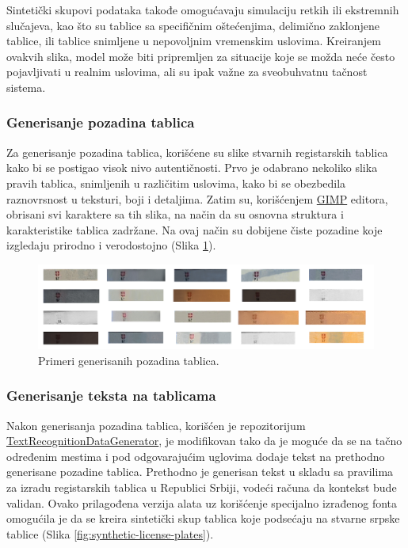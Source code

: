 \documentclass[a4paper,12pt]{article}
\begin{document}
	Sintetički skupovi podataka takođe omogućavaju simulaciju retkih ili ekstremnih slučajeva, kao što su tablice sa specifičnim oštećenjima, delimično zaklonjene tablice, ili tablice snimljene u nepovoljnim vremenskim uslovima. Kreiranjem ovakvih slika, model može biti pripremljen za situacije koje se možda neće često pojavljivati u realnim uslovima, ali su ipak važne za sveobuhvatnu tačnost sistema.
	
	\subsubsection{Generisanje pozadina tablica}
	
	Za generisanje pozadina tablica, korišćene su slike stvarnih registarskih tablica kako bi se postigao visok nivo autentičnosti. Prvo je odabrano nekoliko slika pravih tablica, snimljenih u različitim uslovima, kako bi se obezbedila raznovrsnost u teksturi, boji i detaljima. Zatim su, korišćenjem \href{https://www.gimp.org/}{GIMP} editora, obrisani svi karaktere sa tih slika, na način da su osnovna struktura i karakteristike tablica zadržane. Na ovaj način su dobijene čiste pozadine koje izgledaju prirodno i verodostojno (Slika \ref{fig:license-plate-backgrounds}).
	
	\begin{figure}[H]
		\centering
		\includegraphics[width=\textwidth]{assets/license-plate-backgrounds.png}
		\caption{Primeri generisanih pozadina tablica.}
		\label{fig:license-plate-backgrounds}
	\end{figure}
	
	\subsubsection{Generisanje teksta na tablicama}
	
	Nakon generisanja pozadina tablica, korišćen je repozitorijum \href{https://github.com/Belval/TextRecognitionDataGenerator}{TextRecognitionDataGenerator}, je modifikovan tako da je moguće da se na tačno određenim mestima i pod odgovarajućim uglovima dodaje tekst na prethodno generisane pozadine tablica. Prethodno je generisan tekst u skladu sa pravilima za izradu registarskih tablica u Republici Srbiji, vodeći računa da kontekst bude validan. Ovako prilagođena verzija alata uz korišćenje specijalno izrađenog fonta omogućila je da se kreira sintetički skup tablica koje podsećaju na stvarne srpske tablice (Slika \ref{fig:synthetic-license-plates}).
	
\end{document}
